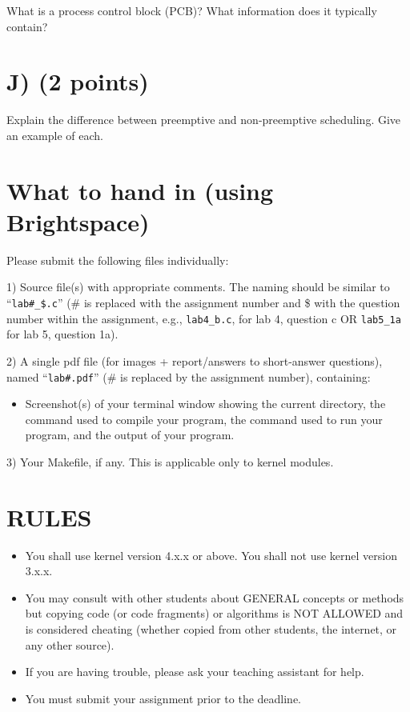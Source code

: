 \documentclass{article}
\begin{document}
What is a process control block (PCB)?  What information does it typically contain?


\section*{J) (2 points)}

Explain the difference between preemptive and non-preemptive scheduling.  Give an example of each.


\section*{What to hand in (using Brightspace)}

Please submit the following files individually:

1) Source file(s) with appropriate comments. The naming should be similar to “\texttt{lab\#\_\$.c}” (\# is replaced with the assignment number and \$ with the question number within the assignment, e.g., \texttt{lab4\_b.c}, for lab 4, question c OR \texttt{lab5\_1a} for lab 5, question 1a).

2) A single pdf file (for images + report/answers to short-answer questions), named “\texttt{lab\#.pdf}” (\# is replaced by the assignment number), containing:
    \begin{itemize}
        \item Screenshot(s) of your terminal window showing the current directory, the command used to compile your program, the command used to run your program, and the output of your program.
    \end{itemize}

3) Your Makefile, if any. This is applicable only to kernel modules.


\section*{RULES}

\begin{itemize}
    \item You shall use kernel version 4.x.x or above. You shall not use kernel version 3.x.x.
    \item You may consult with other students about GENERAL concepts or methods but copying code (or code fragments) or algorithms is NOT ALLOWED and is considered cheating (whether copied from other students, the internet, or any other source).
    \item If you are having trouble, please ask your teaching assistant for help.
    \item You must submit your assignment prior to the deadline.
\end{itemize}
\end{document}
